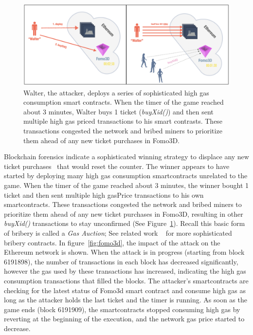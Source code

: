 \begin{figure}[t]
    \centering
    \includegraphics[width=1\linewidth]{figures/fomo3d_walter.png}
    \caption[Fomo3D attack visualization]{Walter, the attacker, deploys a series of sophisticated high gas consumption smart contracts. When the timer of the game reached about 3 minutes, Walter buys 1 ticket (\textit{buyXid()}) and then sent multiple high gas priced transactions to his smart contrasts. These transactions congested the network and bribed miners to prioritize them ahead of any new ticket purchases in Fomo3D.}
    \label{fig:fomo3dvisualization}
\end{figure}

Blockchain forensics indicate a sophisticated winning strategy to displace any new ticket purchases~\cite{fomo3dhacker} that would reset the counter. The winner appears to have started by deploying many high gas consumption smartcontracts unrelated to the game. When the timer of the game reached about 3 minutes, the winner bought 1 ticket and then sent multiple high gasPrice transactions to his own smartcontracts. These transactions congested the network and bribed miners to prioritize them ahead of any new ticket purchases in \textsf{Fomo3D}, resulting in other \textit{buyXid()} transactions to stay unconfirmed (See Figure~\ref{fig:fomo3dvisualization}). Recall this basic form of bribery is called a \textit{Gas Auction}; See related work ~\cite{mccorry2018smart,bonneau2016buy} for more sophisticated bribery contracts. In figure~\ref{fig:fomo3d}, the impact of the attack on the Ethereum network is shown. When the attack is in progress (starting from block 6191898), the number of transactions in each block has decreased significantly, however the gas used by these transactions has increased, indicating the high gas consumption transactions that filled the blocks. The attacker's smartcontracts are checking for the latest status of Fomo3d smart contract and consume high gas as long as the attacker holds the last ticket and the timer is running. As soon as the game ends (block 6191909), the smartcontracts stopped consuming high gas by reverting at the beginning of the execution, and the network gas price started to decrease.

